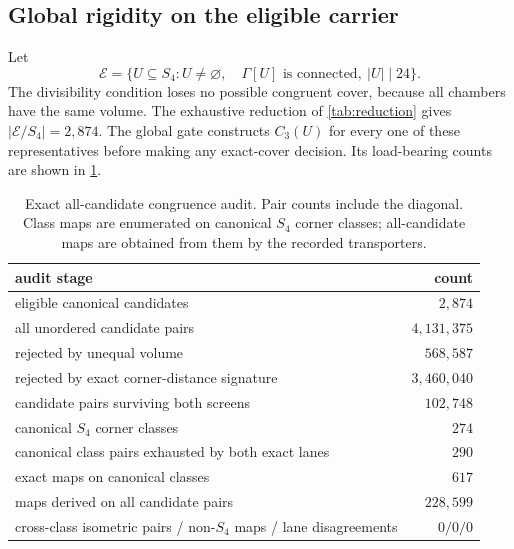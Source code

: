 \subsection{Global rigidity on the eligible carrier}

Let
\[
 \mathcal E=\{U\subseteq S_4:U\ne\varnothing,\quad
 \Gamma[U]\text{ is connected},\ |U|\mid24\}.
\]
The divisibility condition loses no possible congruent cover, because all
chambers have the same volume.  The exhaustive reduction of
\cref{tab:reduction} gives $|\mathcal E/S_4|=2{,}874$.  The global gate
constructs $C_3(U)$ for every one of these representatives before making any
exact-cover decision.  Its load-bearing counts are shown in
\cref{tab:global-rigidity}.

\begin{table}[ht]
\centering
\caption{Exact all-candidate congruence audit.  Pair counts include the
diagonal.  Class maps are enumerated on canonical $S_4$ corner classes;
all-candidate maps are obtained from them by the recorded transporters.}
\label{tab:global-rigidity}
\begin{tabular}{@{}lr@{}}
\toprule
audit stage & count\\
\midrule
eligible canonical candidates & $2{,}874$\\
all unordered candidate pairs & $4{,}131{,}375$\\
rejected by unequal volume & $568{,}587$\\
rejected by exact corner-distance signature & $3{,}460{,}040$\\
candidate pairs surviving both screens & $102{,}748$\\
canonical $S_4$ corner classes & $274$\\
canonical class pairs exhausted by both exact lanes & $290$\\
exact maps on canonical classes & $617$\\
maps derived on all candidate pairs & $228{,}599$\\
cross-class isometric pairs / non-$S_4$ maps / lane disagreements & $0/0/0$\\
\bottomrule
\end{tabular}
\end{table}

